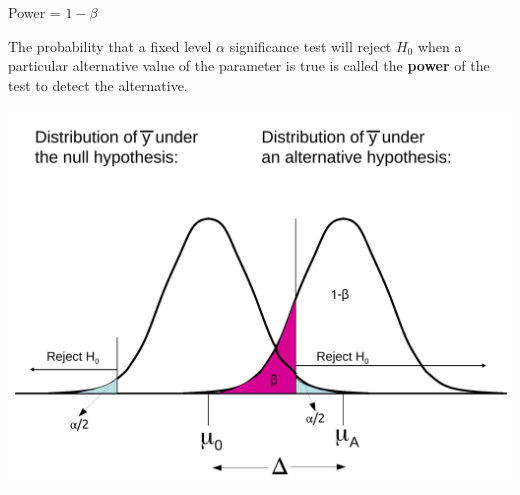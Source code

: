 \documentclass{beamer}\usepackage[]{graphicx}\usepackage[]{color}
\begin{document}
\begin{frame}[fragile]{Power = $1 - \beta$}

\vspace*{-0.2in}

\begin{defm}[Power = $1-\beta$]
	The probability that a fixed level $\alpha$ significance test will reject $H_0$ when a particular alternative value of the parameter is true is called the \textbf{power} of the test to detect the alternative. 
\end{defm}


\vspace*{-0.08in}

\centering
\includegraphics[scale=0.31]{../sample_size/HypTest3-3.pdf}


\end{frame}
\end{document}
